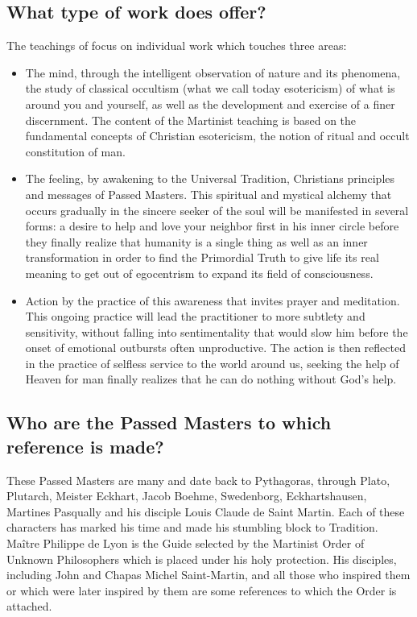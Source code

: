 \subsection*{What type of work does \moup{} offer?}

The teachings of \moup{} focus on individual work which touches three areas:
\begin{itemize}
    \item The mind, through the intelligent observation of nature and its phenomena, the
study of classical occultism (what we call today esotericism) of what is around you
and yourself, as well as the development and exercise of a finer discernment. The
content of the Martinist teaching is based on the fundamental concepts of Christian
esotericism, the notion of ritual and occult constitution of man.
    \item The feeling, by awakening to the Universal Tradition, Christians principles and
messages of Passed Masters. This spiritual and mystical alchemy that occurs
gradually in the sincere seeker of the soul will be manifested in several forms: a
desire to help and love your neighbor first in his inner circle before they finally
realize that humanity is a single thing as well as an inner transformation in order to
find the Primordial Truth to give life its real meaning to get out of egocentrism to
expand its field of consciousness.
    \item Action by the practice of this awareness that invites prayer and meditation. This
ongoing practice will lead the practitioner to more subtlety and sensitivity, without
falling into sentimentality that would slow him before the onset of emotional
outbursts often unproductive. The action is then reflected in the practice of selfless
service to the world around us, seeking the help of Heaven for man finally realizes
that he can do nothing without God's help.
\end{itemize}

\subsection*{Who are the Passed Masters to which reference is made?}

These Passed Masters are many and date back to Pythagoras, through Plato, Plutarch,
Meister Eckhart, Jacob Boehme, Swedenborg, Eckhartshausen, Martines Pasqually and his
disciple Louis Claude de Saint Martin. Each of these characters has marked his time and
made his stumbling block to Tradition. Maître Philippe de Lyon is the Guide selected by the
Martinist Order of Unknown Philosophers which is placed under his holy protection.
His disciples, including John and Chapas Michel Saint-Martin, and all those who inspired
them or which were later inspired by them are some references to which the Order is
attached.

